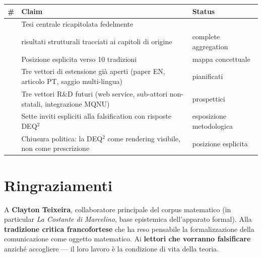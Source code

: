 {\def\LTcaptype{none} %
{\small\begin{longtable}[]{@{}
  >{\raggedright\arraybackslash}p{}
  >{\raggedright\arraybackslash}p{}
  >{\raggedright\arraybackslash}p{}@{}}
\toprule\noalign{}
\begin{minipage}[b]{\linewidth}\raggedright
\#
\end{minipage} & \begin{minipage}[b]{\linewidth}\raggedright
Claim
\end{minipage} & \begin{minipage}[b]{\linewidth}\raggedright
Status
\end{minipage} \\
\midrule\noalign{}
\endhead
\bottomrule\noalign{}
\endlastfoot
1 & Tesi centrale ricapitolata fedelmente & \Proved{} \\
2 & 21 risultati strutturali tracciati ai capitoli di origine &
\Proved{} complete aggregation \\
3 & Posizione esplicita verso 10 tradizioni & \Hypoth{} mappa
concettuale \\
4 & Tre vettori di estensione già aperti (paper EN, articolo PT, saggio
multi-lingua) & \Proved{} pianificati \\
5 & Tre vettori R\&D futuri (web service, sub-attori non-statali,
integrazione MQNU) & \Conj{} prospettici \\
6 & Sette inviti espliciti alla falsification con risposte DEQ$^2$ &
\Hypoth{} esposizione metodologica \\
7 & Chiusura politica: la DEQ$^2$ come rendering visibile, non come
prescrizione & \Hypoth{} posizione esplicita \\
\end{longtable}}
}



\section{Ringraziamenti}\label{ringraziamenti}

A \textbf{Clayton Teixeira}, collaboratore principale del corpus
matematico (in particular \emph{La Costante di Marcelino}, base
epistemica dell'apparato formal). Alla \textbf{tradizione critica
francofortese} che ha reso pensabile la formalizzazione della
comunicazione come oggetto matematico. Ai \textbf{lettori che vorranno
falsificare} anziché accogliere --- il loro lavoro è la condizione di
vita della teoria.


